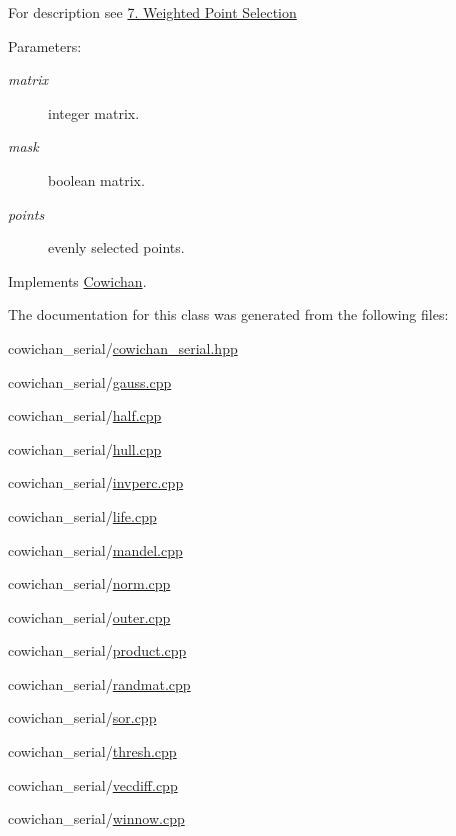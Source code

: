 For description see \hyperlink{index_winnow_sec}{7. Weighted Point Selection} \begin{Desc}
\item[Parameters:]
\begin{description}
\item[{\em matrix}]integer matrix. \item[{\em mask}]boolean matrix. \item[{\em points}]evenly selected points. \end{description}
\end{Desc}


Implements \hyperlink{class_cowichan_13d60e06ced3b5da79d62c133ce82337}{Cowichan}.

The documentation for this class was generated from the following files:\begin{CompactItemize}
\item 
cowichan\_\-serial/\hyperlink{cowichan__serial_8hpp}{cowichan\_\-serial.hpp}\item 
cowichan\_\-serial/\hyperlink{cowichan__serial_2gauss_8cpp}{gauss.cpp}\item 
cowichan\_\-serial/\hyperlink{cowichan__serial_2half_8cpp}{half.cpp}\item 
cowichan\_\-serial/\hyperlink{cowichan__serial_2hull_8cpp}{hull.cpp}\item 
cowichan\_\-serial/\hyperlink{cowichan__serial_2invperc_8cpp}{invperc.cpp}\item 
cowichan\_\-serial/\hyperlink{cowichan__serial_2life_8cpp}{life.cpp}\item 
cowichan\_\-serial/\hyperlink{cowichan__serial_2mandel_8cpp}{mandel.cpp}\item 
cowichan\_\-serial/\hyperlink{cowichan__serial_2norm_8cpp}{norm.cpp}\item 
cowichan\_\-serial/\hyperlink{cowichan__serial_2outer_8cpp}{outer.cpp}\item 
cowichan\_\-serial/\hyperlink{cowichan__serial_2product_8cpp}{product.cpp}\item 
cowichan\_\-serial/\hyperlink{cowichan__serial_2randmat_8cpp}{randmat.cpp}\item 
cowichan\_\-serial/\hyperlink{cowichan__serial_2sor_8cpp}{sor.cpp}\item 
cowichan\_\-serial/\hyperlink{cowichan__serial_2thresh_8cpp}{thresh.cpp}\item 
cowichan\_\-serial/\hyperlink{cowichan__serial_2vecdiff_8cpp}{vecdiff.cpp}\item 
cowichan\_\-serial/\hyperlink{cowichan__serial_2winnow_8cpp}{winnow.cpp}\end{CompactItemize}
